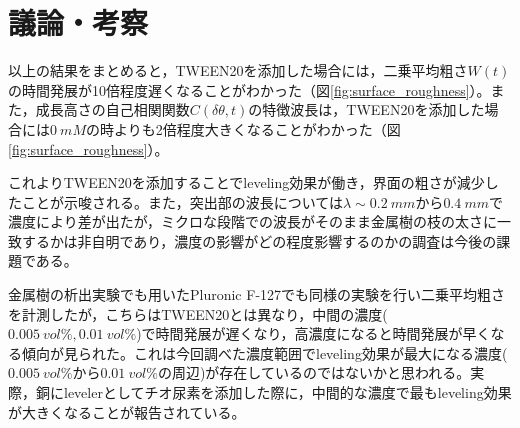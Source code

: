\documentclass[autodetect-engine,dvi=dvipdfmx,a4paper,ja=standard,oneside,openany,11pt,draft]{bxjsbook}
\begin{document}
\section{議論・考察}
以上の結果をまとめると，TWEEN20を添加した場合には，二乗平均粗さ$W(t)$の時間発展が10倍程度遅くなることがわかった（図\ref{fig:surface_roughness}）。また，成長高さの自己相関関数$C(\delta\theta,t)$の特徴波長は，TWEEN20を添加した場合には$\SI{0}{mM}$の時よりも2倍程度大きくなることがわかった（図\ref{fig:surface_roughness}）。

これよりTWEEN20を添加することでleveling効果が働き，界面の粗さが減少したことが示唆される。また，突出部の波長については$\lambda\sim\SI{0.2}{mm}$から$\SI{0.4}{mm}$で濃度により差が出たが，ミクロな段階での波長がそのまま金属樹の枝の太さに一致するかは非自明であり，濃度の影響がどの程度影響するのかの調査は今後の課題である。

金属樹の析出実験でも用いたPluronic F-127でも同様の実験を行い二乗平均粗さを計測したが，こちらはTWEEN20とは異なり，中間の濃度($\SI{0.005}{vol\%},\SI{0.01}{vol\%}$)で時間発展が遅くなり，高濃度になると時間発展が早くなる傾向が見られた。これは今回調べた濃度範囲でleveling効果が最大になる濃度($\SI{0.005}{vol\%}$から$\SI{0.01}{vol\%}$の周辺)が存在しているのではないかと思われる。実際，銅にlevelerとしてチオ尿素を添加した際に，中間的な濃度で最もleveling効果が大きくなることが報告されている\cite{schilardi2000stable}。

\ifdraft{
  
  
}{}
\end{document}
